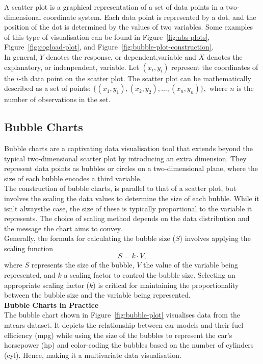 \documentclass{article}\usepackage[]{graphicx}\usepackage[]{xcolor}
\numberwithin{equation}{section}
\begin{document}
A scatter plot is a graphical representation of a set of data points in a two-dimensional coordinate system. Each data point is represented by a dot, and the position of the dot is determined by the values of two variables. Some examples of this type of visualisation can be found in Figure~\ref{fig:abs-plots}, Figure~\ref{fig:cogload-plot}, and Figure~\ref{fig:bubble-plot-construction}.\\

\noindent
In general, \(Y\) denotes the response, or dependent,variable and \(X\) denotes the explanatory, or indenpendent,  variable. Let \((x_i, y_i)\) represent the coordinates of the \(i\)-th data point on the scatter plot. The scatter plot can be mathematically described as a set of points: \( \{(x_1, y_1), (x_2, y_2), \ldots, (x_n, y_n)\}, \) where \(n\) is the number of observations in the set.

\subsection{Bubble Charts}
Bubble charts are a captivating data visualisation tool that extends beyond the typical two-dimensional scatter plot by introducing an extra dimension. They represent data points as bubbles or circles on a two-dimensional plane, where the size of each bubble encodes a third variable.\\

\noindent The construction of bubble charts, is parallel to that of a scatter plot, but involves the scaling the data values to determine the size of each bubble. While it isn't alwaysthe case, the size of these is typically proportional to the variable it represents. The choice of scaling method depends on the data distribution and the message the chart aims to convey.\\

\noindent Generally, the formula for calculating the bubble size (\(S\)) involves applying the scaling function
\[
S = k \cdot V,
\]
\noindent where \(S\) represents the size of the bubble, \(V\) the value of the variable being represented, and \(k\) a scaling factor to control the bubble size. Selecting an appropriate scaling factor (\(k\)) is critical for maintaining the proportionality between the bubble size and the variable being represented.\\

\noindent
\textbf{Bubble Charts in Practice}\\
The bubble chart shown in Figure~\ref{fig:bubble-plot} visualises data from the mtcars dataset. It depicts the relationship between car models and their fuel efficiency (mpg) while using the size of the bubbles to represent the car's horsepower (hp) and color-coding the bubbles based on the number of cylinders (cyl). Hence, making it a multivariate data visualisation.\\
\end{document}
